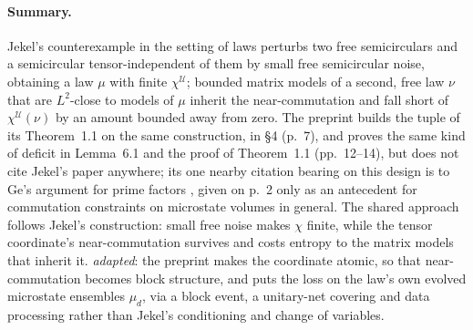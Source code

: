 \documentclass[11pt]{article}
\newcommand{\ploc}[2]{#1}
\newcommand{\sloc}[2]{\cite[#2]{#1}}
\newcommand{\rel}[1]{\textit{#1}}
\begin{document}
\paragraph{Summary.}
Jekel's counterexample in the setting of laws
\sloc{Jekel2025CMP-InformationGeometryTypesLargeN}{\S4.4, pp.~45--51} perturbs
two free semicirculars and a semicircular tensor-independent of them by small
free semicircular noise, obtaining a law $\mu$ with finite
$\chi^{\mathcal U}$; bounded matrix models of a second, free law $\nu$ that
are $L^2$-close to models of $\mu$ inherit the near-commutation and fall short
of $\chi^{\mathcal U}(\nu)$ by an amount bounded away from zero.
The preprint builds the tuple of its
\ploc{Theorem~1.1}{01-introduction.tex:42--51} on the same construction, in
\ploc{\S4 (p.~7)}{04-signal.tex:3--21}, and proves the same kind of deficit
in \ploc{Lemma~6.1 and the proof of Theorem~1.1 (pp.~12--14)}{06-blocks.tex:79--193},
but does not cite Jekel's paper anywhere; its one nearby citation bearing on
this design is to Ge's argument for prime factors \cite{NL-Ge1996}, given on
\ploc{p.~2}{01-introduction.tex:83--85} only as an antecedent for commutation
constraints on microstate volumes in general.
The shared approach follows Jekel's construction: small free noise makes
$\chi$ finite, while the tensor coordinate's near-commutation survives and
costs entropy to the matrix models that inherit it.
\rel{adapted}: the preprint makes the coordinate atomic, so that
near-commutation becomes block structure, and puts the loss on the law's own
evolved microstate ensembles $\mu_d$, via a block event, a unitary-net
covering and data processing rather than Jekel's conditioning and change of
variables.
\end{document}
